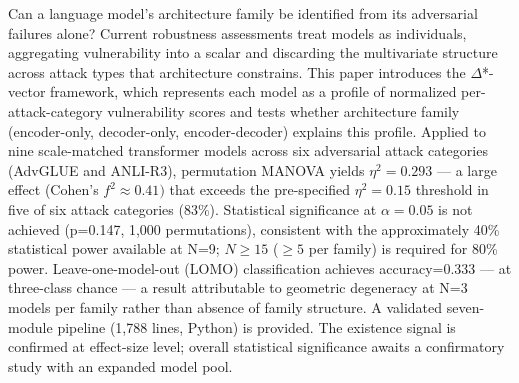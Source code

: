 
Can a language model's architecture family be identified from its adversarial failures alone? Current robustness assessments treat models as individuals, aggregating vulnerability into a scalar and discarding the multivariate structure across attack types that architecture constrains. This paper introduces the $\Delta$*-vector framework, which represents each model as a profile of normalized per-attack-category vulnerability scores and tests whether architecture family (encoder-only, decoder-only, encoder-decoder) explains this profile. Applied to nine scale-matched transformer models across six adversarial attack categories (AdvGLUE and ANLI-R3), permutation MANOVA yields $\eta^{2}=0.293$ --- a large effect (Cohen's $f^{2}\approx 0.41)$ that exceeds the pre-specified $\eta^{2}=0.15$ threshold in five of six attack categories (83\%). Statistical significance at $\alpha =0.05$ is not achieved (p=0.147, 1,000 permutations), consistent with the approximately 40\% statistical power available at N=9; $N\geq 15$ ($\geq 5$ per family) is required for 80\% power. Leave-one-model-out (LOMO) classification achieves accuracy=0.333 --- at three-class chance --- a result attributable to geometric degeneracy at N=3 models per family rather than absence of family structure. A validated seven-module pipeline (1,788 lines, Python) is provided. The existence signal is confirmed at effect-size level; overall statistical significance awaits a confirmatory study with an expanded model pool.

